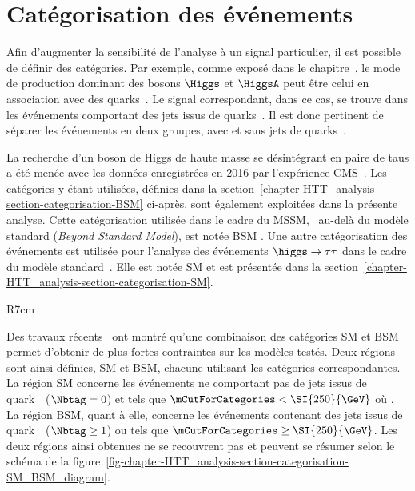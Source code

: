 \section{Catégorisation des événements}\label{chapter-HTT_analysis-section-categorisation}
Afin d'augmenter la sensibilité de l'analyse à un signal particulier, il est possible de définir des catégories.
Par exemple, comme exposé dans le chapitre~, le mode de production dominant des bosons $\Higgs$ et $\HiggsA$ peut être celui en association avec des quarks~\quarkb.
Le signal correspondant, dans ce cas, se trouve dans les événements comportant des jets issus de quarks~\quarkb.
Il est donc pertinent de séparer les événements en deux groupes, avec et sans jets de quarks~\quarkb.
\par
La recherche d'un boson de Higgs de haute masse se désintégrant en paire de taus a été menée avec les données enregistrées en 2016 par l'expérience CMS~\cite{CMS-PAS-HIG-17-020}.
Les catégories y étant utilisées, définies dans la section~\ref{chapter-HTT_analysis-section-categorisation-BSM} ci-après, sont également exploitées dans la présente analyse.
Cette catégorisation utilisée dans le cadre du MSSM, \ie\ au-delà du modèle standard (\emph{Beyond Standard Model}), est notée \og BSM \fg{}.
Une autre catégorisation des événements est utilisée pour l'analyse des événements $\higgs\to\tau\tau$ dans le cadre du modèle standard~\cite{CMS-PAS-HIG-19-010}. 
Elle est notée \og SM \fg{} et est présentée dans la section~\ref{chapter-HTT_analysis-section-categorisation-SM}.
\begin{wrapfigure}{R}{7cm}
\centering

\caption{Définition des deux régions utilisant des catégories différentes.}
\label{fig-chapter-HTT_analysis-section-categorisation-SM_BSM_diagram}
\end{wrapfigure}
\par
Des travaux récents~\cite{Artur_thesis} ont montré qu'une combinaison des catégories SM et BSM permet d'obtenir de plus fortes contraintes sur les modèles testés.
Deux régions sont ainsi définies, SM et BSM, chacune utilisant les catégories correspondantes.
La région SM concerne les événements ne comportant pas de jets issus de quark~\quarkb\ ($\Nbtag=0$) et tels que $\mCutForCategories < \SI{250}{\GeV}$ où
\mCutForCategoriesdef.
La région BSM, quant à elle, concerne les événements contenant des jets issus de quark~\quarkb\ ($\Nbtag\geq1$) ou tels que $\mCutForCategories \geq \SI{250}{\GeV}$.
Les deux régions ainsi obtenues ne se recouvrent pas et peuvent se résumer selon le schéma de la figure~\ref{fig-chapter-HTT_analysis-section-categorisation-SM_BSM_diagram}.

